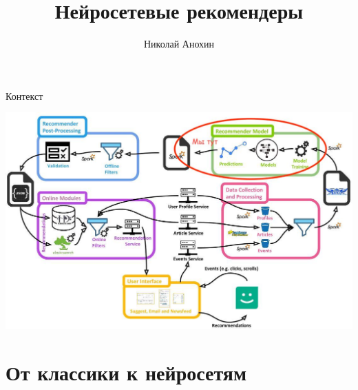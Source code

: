 \documentclass[11pt,aspectratio=169]{beamer}
\author{Николай Анохин}
\title{Нейросетевые рекомендеры}
\begin{document}
{

\begin{frame}
\titlepage
\end{frame}


}

\begin{frame}{Контекст}

\begin{center}
\includegraphics[scale=0.23]{images/mendeley.jpeg}
\end{center}

\end{frame}

\section{От классики к нейросетям}
\end{document}
